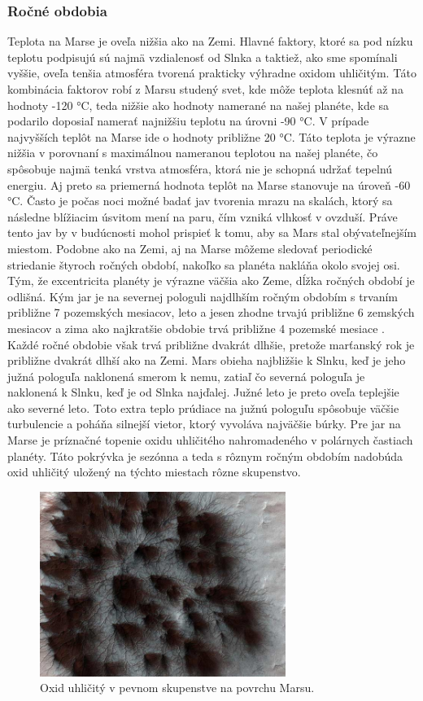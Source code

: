 \subsubsection{Ročné obdobia}
Teplota na Marse je oveľa nižšia ako na Zemi. Hlavné faktory, ktoré sa pod nízku teplotu podpisujú sú najmä vzdialenosť od Slnka a taktiež, ako sme spomínali vyššie, oveľa tenšia atmosféra tvorená prakticky výhradne oxidom uhličitým. Táto kombinácia faktorov robí z Marsu studený svet, kde môže teplota klesnúť až na hodnoty -120 °C, teda nižšie ako hodnoty namerané na našej planéte, kde sa podarilo doposiaľ namerať najnižšiu teplotu na úrovni -90 °C. V prípade najvyšších teplôt na Marse ide o hodnoty približne 20 °C. Táto teplota je výrazne nižšia v porovnaní s maximálnou nameranou teplotou na našej planéte, čo spôsobuje najmä tenká vrstva atmosféra, ktorá nie je schopná udržať tepelnú energiu. Aj preto sa priemerná hodnota teplôt na Marse stanovuje na úroveň -60 °C. Často je počas noci možné badať jav tvorenia mrazu na skalách, ktorý sa následne blížiacim úsvitom mení na paru, čím vzniká vlhkosť v ovzduší. Práve tento jav by v budúcnosti mohol prispieť k tomu, aby sa Mars stal obývateľnejším miestom. 
Podobne ako na Zemi, aj na Marse môžeme sledovať periodické striedanie štyroch ročných období, nakoľko sa planéta nakláňa okolo svojej osi. Tým, že excentricita planéty je výrazne väčšia ako Zeme, dĺžka ročných období je odlišná. Kým jar je na severnej pologuli najdlhším ročným obdobím s trvaním približne 7 pozemských mesiacov, leto a jesen zhodne trvajú približne 6 zemských mesiacov a zima ako najkratšie obdobie trvá približne 4 pozemské mesiace \cite{mars_meteo1}.
Každé ročné obdobie však trvá približne dvakrát dlhšie, pretože marťanský rok je približne dvakrát dlhší ako na Zemi. Mars obieha najbližšie k Slnku, keď je jeho južná pologuľa naklonená smerom k nemu, zatiaľ čo severná pologuľa je naklonená k Slnku, keď je od Slnka najďalej. Južné leto je preto oveľa teplejšie ako severné leto. Toto extra teplo prúdiace na južnú pologuľu spôsobuje väčšie turbulencie a poháňa silnejší vietor, ktorý vyvoláva najväčšie búrky. 
Pre jar na Marse je príznačné topenie oxidu uhličitého nahromadeného v polárnych častiach planéty. Táto pokrývka je sezónna a teda s rôznym ročným obdobím nadobúda oxid uhličitý uložený na týchto miestach rôzne skupenstvo.
\begin{figure}[!htbp]
  \centering
  \includegraphics[width=8cm]{img/co2.jpg}
  \caption{Oxid uhličitý v pevnom skupenstve na povrchu Marsu.}
  \label{co2}
\end{figure}
